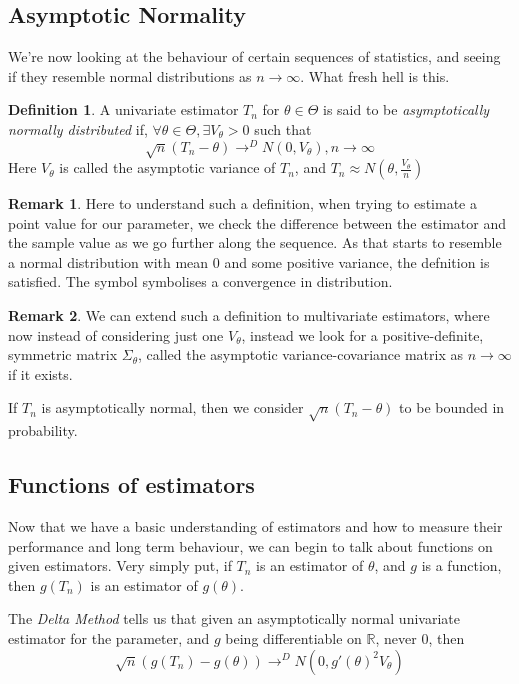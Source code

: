 \documentclass[12pt]{book}
\theoremstyle{definition}
\newtheorem*{definition}{Definition}
\newtheorem*{remark}{Remark}
\begin{document}
\subsection{Asymptotic Normality}
We're now looking at the behaviour of certain sequences of statistics, and seeing if they resemble normal distributions as $n \to \infty$. What fresh hell is this.
\begin{definition}
    A univariate estimator $T_n$ for $\theta \in \Theta$ is said to be \textit{asymptotically normally distributed} if, $\forall \theta \in \Theta, \exists V_{\theta} > 0$ such that $$\sqrt{n}(T_n - \theta) \to^D N(0, V_{\theta}), n \to \infty$$
    Here $V_{\theta}$ is called the asymptotic variance of $T_n$, and $T_n \approx N(\theta, \frac{V_{\theta}}{n})$
\end{definition}
\begin{remark}
    Here to understand such a definition, when trying to estimate a point value for our parameter, we check the difference between the estimator and the sample value as we go further along the sequence. As that starts to resemble a normal distribution with mean 0 and some positive variance, the defnition is satisfied.
    The symbol symbolises a convergence in distribution.
\end{remark}
\begin{remark}
    We can extend such a definition to multivariate estimators, where now instead of considering just one $V_{\theta}$, instead we look for a positive-definite, symmetric matrix $\Sigma_{\theta}$, called the asymptotic variance-covariance matrix as $n \to \infty$ if it exists.
\end{remark}

If $T_n$ is asymptotically normal, then we consider $\sqrt{n}(T_n - \theta)$ to be bounded in probability.

\subsection{Functions of estimators}
Now that we have a basic understanding of estimators and how to measure their performance and long term behaviour, we can begin to talk about functions on given estimators. Very simply put, if $T_n$ is an estimator of $\theta$, and $g$ is a function, then $g(T_n)$ is an estimator of $g(\theta)$.

The \textit{Delta Method} tells us that given an asymptotically normal univariate estimator for the parameter, and $g$ being differentiable on $\mathbb{R}$, never $0$, then $$\sqrt{n}(g(T_n) - g(\theta)) \to^D N(0, g'(\theta)^2 V_{\theta})$$
\end{document}
